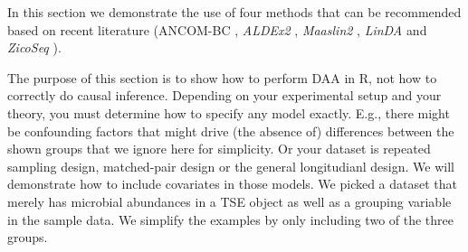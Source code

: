 \documentclass[
]{book}
\newenvironment{Shaded}{\begin{snugshade}}{\end{snugshade}}
\newcommand{\CommentTok}[1]{\textcolor[rgb]{0.56,0.35,0.01}{\textit{#1}}}
\newcommand{\DecValTok}[1]{\textcolor[rgb]{0.00,0.00,0.81}{#1}}
\newcommand{\FunctionTok}[1]{\textcolor[rgb]{0.00,0.00,0.00}{#1}}
\newcommand{\NormalTok}[1]{#1}
\newcommand{\OtherTok}[1]{\textcolor[rgb]{0.56,0.35,0.01}{#1}}
\newcommand{\SpecialCharTok}[1]{\textcolor[rgb]{0.00,0.00,0.00}{#1}}
\newcommand{\StringTok}[1]{\textcolor[rgb]{0.31,0.60,0.02}{#1}}
\begin{document}
In this section we demonstrate the use of four methods that can be
recommended based on recent literature (ANCOM-BC \citep{ancombc2020},
\emph{ALDEx2} \citep{Gloor2016}, \emph{Maaslin2} \citep{Mallick2020}, \emph{LinDA} \citep{Zhou2022}
and \emph{ZicoSeq} \citep{Yang2022}).

The purpose of this section is to show how to perform DAA in R, not
how to correctly do causal inference. Depending on your experimental
setup and your theory, you must determine how to specify any model
exactly. E.g., there might be confounding factors that might drive
(the absence of) differences between the shown groups that we ignore
here for simplicity. Or your dataset is repeated sampling design,
matched-pair design or the general longitudianl design. We will
demonstrate how to include covariates in those models. We picked a
dataset that merely has microbial abundances in a TSE object as well
as a grouping variable in the sample data. We simplify the examples by
only including two of the three groups.

\begin{Shaded}
\end{Shaded}
\end{document}
